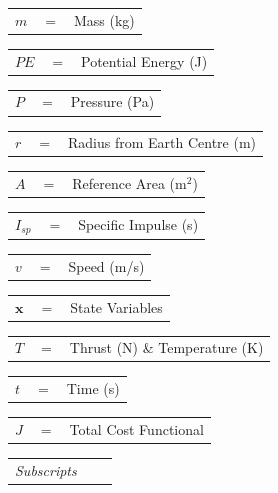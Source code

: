 \begin{tabular}{p{0.8cm}p{0.8cm}p{5.6cm}}
	$m$ & $=$ & Mass (kg)\\
\end{tabular} 
\begin{tabular}{p{0.8cm}p{0.8cm}p{5.6cm}}
	$PE$ & $=$ & Potential Energy (J)\\
\end{tabular} 
\begin{tabular}{p{0.8cm}p{0.8cm}p{5.6cm}}
	$P$ & $=$ & Pressure (Pa)  \\
\end{tabular}
\begin{tabular}{p{0.8cm}p{0.8cm}p{5.6cm}}
	$r$ & $=$ & Radius from Earth Centre (m)\\
\end{tabular} 
\begin{tabular}{p{0.8cm}p{0.8cm}p{5.6cm}}
	$A$ & $=$ & Reference Area (m$^2$)\\
\end{tabular} 
\begin{tabular}{p{0.8cm}p{0.8cm}p{5.6cm}}
	$I_{sp}$ & $=$ & Specific Impulse (s)\\ 
\end{tabular} 
\begin{tabular}{p{0.8cm}p{0.8cm}p{5.6cm}}
	$v$ & $=$ & Speed (m/s)\\
\end{tabular} 
\begin{tabular}{p{0.8cm}p{0.8cm}p{5.6cm}}
	$\textbf{x}$& $=$ & State Variables\\
\end{tabular} 
\begin{tabular}{p{0.8cm}p{0.8cm}p{5.6cm}}
	$T$ & $=$ & Thrust (N) \& Temperature (K)\\
\end{tabular} 
\begin{tabular}{p{0.8cm}p{0.8cm}p{5.6cm}}
	$t$ & $=$ & Time (s)\\
\end{tabular} 
\begin{tabular}{p{0.8cm}p{0.8cm}p{5.6cm}}
	$J$ & $=$ & Total Cost Functional\\
\end{tabular}
\newline  	
\vspace{0.5in}
\begin{tabular}{p{5.2cm}p{1cm}p{5cm}}
	\textit{Subscripts} & & \\
\end{tabular} 
